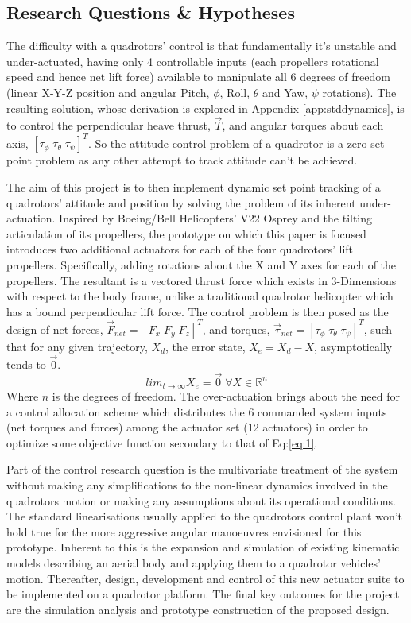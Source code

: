 \subsection{Research Questions \& Hypotheses}
\label{subsec:intro.foreword.hypotheses}
The difficulty with a quadrotors' control is that fundamentally it's unstable and under-actuated, having only 4 controllable inputs (each propellers rotational speed and hence net lift force) available to manipulate all 6 degrees of freedom (linear X-Y-Z position and angular Pitch, $\phi$, Roll, $\theta$ and Yaw, $\psi$ rotations). The resulting solution, whose derivation is explored in Appendix \ref{app:stddynamics}, is to control the perpendicular heave thrust, $\vec{T}$, and angular torques about each axis, $[\tau_\phi\;\tau_\theta\;\tau_\psi]^T$. So the attitude control problem of a quadrotor is a zero set point problem as any other attempt to track attitude can't be achieved.
\par
The aim of this project is to then implement dynamic set point tracking of a quadrotors' attitude and position by solving the problem of its inherent under-actuation. Inspired by Boeing/Bell Helicopters' V22 Osprey and the tilting articulation of its propellers, the prototype on which this paper is focused introduces two additional actuators for each of the four quadrotors' lift propellers. Specifically, adding rotations about the X and Y axes for each of the propellers. The resultant is a vectored thrust force which exists in 3-Dimensions with respect to the body frame, unlike a traditional quadrotor helicopter which has a bound perpendicular lift force. The control problem is then posed as the design of net forces, $\vec{F}_{net} = [F_x\;F_y\;F_z]^T$, and torques, $\vec{\tau}_{net} = [\tau_{\phi}\;\tau_{\theta}\;\tau_{\psi}]^T$, such that for any given trajectory, $X_d$, the error state, $X_e = X_d - X$, asymptotically tends to $\vec{0}$.
\begin{equation} \label{eq:1}
lim_{t \rightarrow \infty} X_e = \vec{0}\;\forall X \in \mathbb{R}^n
\end{equation}
Where $n$ is the degrees of freedom. The over-actuation brings about the need for a control allocation scheme which distributes the 6 commanded system inputs (net torques and forces) among the actuator set (12 actuators) in order to optimize some objective function secondary to that of Eq:\ref{eq:1}.
\par
Part of the control research question is the multivariate treatment of the system without making any simplifications to the non-linear dynamics involved in the quadrotors motion or making any assumptions about its operational conditions. The standard linearisations usually applied to the quadrotors control plant won't hold true for the more aggressive angular manoeuvres envisioned for this prototype. Inherent to this is the expansion and simulation of existing kinematic models describing an aerial body and applying them to a quadrotor vehicles' motion. Thereafter, design, development and control of this new actuator suite to be implemented on a quadrotor platform. The final key outcomes for the project are the simulation analysis and prototype construction of the proposed design.
